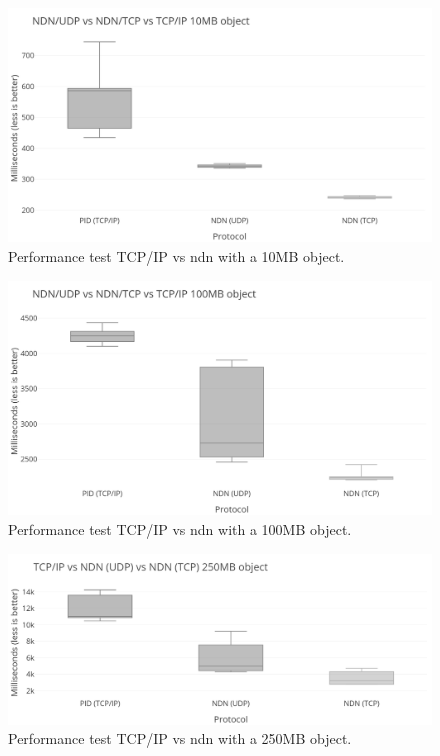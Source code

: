 \begin{figure}[H]
\centering
\includegraphics[scale=0.43]{Images/bench10MB_grey.png}
\caption{Performance test TCP/IP vs \gls{ndn} with a 10MB object.}
\label{fig:perftest-1}
\end{figure}

\begin{figure}[H]
\centering
\includegraphics[scale=0.43]{Images/bench100MB_grey.png}
\caption{Performance test TCP/IP vs \gls{ndn} with a 100MB object.}
\label{fig:perftest-2}
\end{figure}

\begin{figure}[H]
\centering
\includegraphics[scale=0.43]{Images/ndn_tcpip_250_grey.png}
\caption{Performance test TCP/IP vs \gls{ndn} with a 250MB object.}
\label{fig:perftest-3}
\end{figure}

